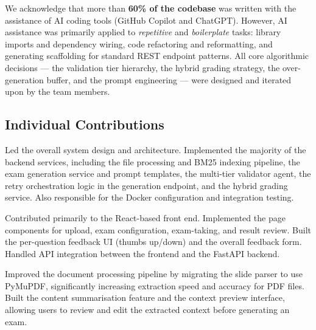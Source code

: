 \documentclass[12pt, a4paper]{article}
\begin{document}
We acknowledge that more than \textbf{60\% of the codebase} was written with the assistance of AI coding tools (GitHub Copilot and ChatGPT). However, AI assistance was primarily applied to \textit{repetitive} and \textit{boilerplate} tasks: library imports and dependency wiring, code refactoring and reformatting, and generating scaffolding for standard REST endpoint patterns. All core algorithmic decisions — the validation tier hierarchy, the hybrid grading strategy, the over-generation buffer, and the prompt engineering — were designed and iterated upon by the team members.

\subsection{Individual Contributions}

\begin{description}[style=nextline, leftmargin=2em, font=\bfseries]
  \item[Pham Khac Duy (Main Contributor) — 220219]
    Led the overall system design and architecture. Implemented the majority of the backend services, including the file processing and BM25 indexing pipeline, the exam generation service and prompt templates, the multi-tier validator agent, the retry orchestration logic in the generation endpoint, and the hybrid grading service. Also responsible for the Docker configuration and integration testing.

  \item[Nguyen Dang Nhat Anh — 220069]
    Contributed primarily to the React-based front end. Implemented the page components for upload, exam configuration, exam-taking, and result review. Built the per-question feedback UI (thumbs up/down) and the overall feedback form. Handled API integration between the frontend and the FastAPI backend.

  \item[Nguyen Huynh Duc — 220080]
    Improved the document processing pipeline by migrating the slide parser to use PyMuPDF, significantly increasing extraction speed and accuracy for PDF files. Built the content summarisation feature and the context preview interface, allowing users to review and edit the extracted context before generating an exam.
\end{description}

\end{document}

